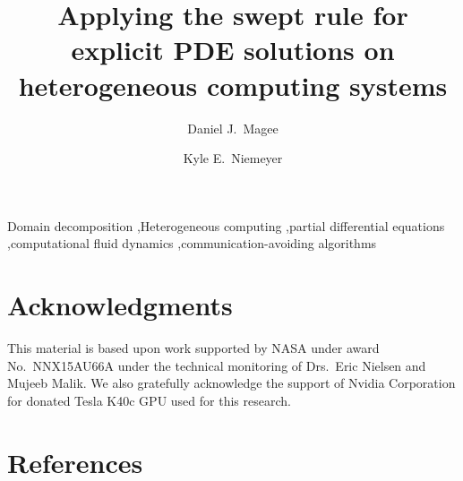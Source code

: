 \documentclass[12pt,number,sort&compress,preprint]{elsarticle}
\begin{document}
\begin{frontmatter}

\title{Applying the swept rule for explicit PDE solutions on heterogeneous computing systems}

\author[OSU]{Daniel J.~Magee}
\author[OSU]{Kyle E.~Niemeyer}

\address[OSU]{School of Mechanical, Industrial, and Manufacturing Engineering,
Oregon State University, Corvallis, OR, USA
}

\begin{abstract}
    
\end{abstract}

\begin{keyword}
    Domain decomposition \sep Heterogeneous computing \sep partial differential equations \sep computational fluid dynamics \sep communication-avoiding algorithms
\end{keyword}

\end{frontmatter}

\linenumbers













\section*{Acknowledgments}

This material is based upon work supported by NASA under award No.~NNX15AU66A
under the technical monitoring of Drs.~Eric Nielsen and Mujeeb Malik.
We also gratefully acknowledge the support of Nvidia Corporation for donated
Tesla K40c GPU used for this research.

\section*{References}


\end{document}
